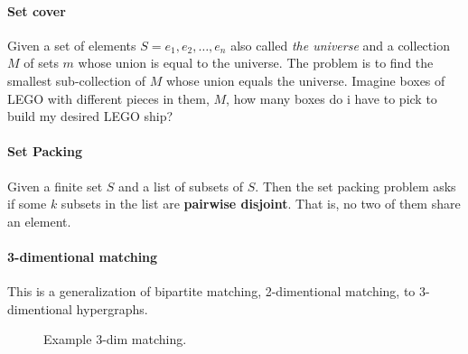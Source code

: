 \documentclass[12pt]{article} %
\begin{document}
\paragraph{Set cover}
Given a set of elements $S = {e_{1}, e_{2}, \dots, e_{n}}$ also called \textit{the universe} and a collection $M$ of sets $m$ whose union is equal to the universe. The problem is to find the smallest sub-collection of $M$ whose union equals the universe. Imagine boxes of LEGO with different pieces in them, $M$, how many boxes do i have to pick to build my desired LEGO ship?

\paragraph{Set Packing}
Given a finite set $S$ and a list of subsets of $S$. Then the set packing problem asks if some $k$ subsets in the list are \textbf{pairwise disjoint}. That is, no two of them share an element. 

\paragraph{3-dimentional matching}
This is a generalization of bipartite matching, 2-dimentional matching, to 3-dimentional hypergraphs.

\begin{figure}[H]
\caption{Example 3-dim matching.}
\label{3dim}
\end{figure} 
\end{document}
